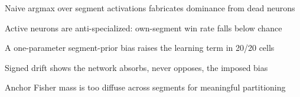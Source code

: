 \documentclass{elsarticle}
\begin{document}
\begin{highlights}
\item Naive argmax over segment activations fabricates dominance from dead neurons
\item Active neurons are anti-specialized: own-segment win rate falls below chance
\item A one-parameter segment-prior bias raises the learning term in 20/20 cells
\item Signed drift shows the network absorbs, never opposes, the imposed bias
\item Anchor Fisher mass is too diffuse across segments for meaningful partitioning
\end{highlights}
\end{document}
